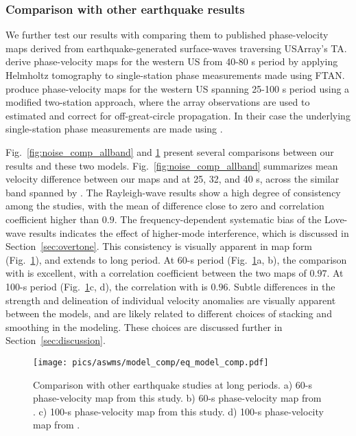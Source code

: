 \subsubsection{Comparison with other earthquake results}

We further test our results with comparing them to published phase-velocity maps derived from earthquake-generated surface-waves traversing USArray's TA. \citet{Lin:2011fw} derive phase-velocity maps for the western US from 40-80 s period by applying Helmholtz tomography to single-station phase measurements made using FTAN. \citet{foster:2014kna} produce phase-velocity maps for the western US spanning 25-100 s period using a modified two-station approach, where the array observations are used to estimated and correct for off-great-circle propagation. In their case the underlying single-station phase measurements are made using \citet{Ekstrom:1997ff}.

Fig.~\ref{fig:noise_comp_allband} and \ref{fig:eq_model_comp} present several comparisons between our results and these two models. Fig.~\ref{fig:noise_comp_allband} summarizes mean velocity difference between our maps and \citet{foster:2014kna} at 25, 32, and 40 s, across the similar band spanned by \citet{Ekstrom:2013dr}. The Rayleigh-wave results show a high degree of consistency among the studies, with the mean of difference close to zero and correlation coefficient higher than $0.9$. The frequency-dependent systematic bias of the Love-wave results indicates the effect of higher-mode interference, which is discussed in Section~\ref{sec:overtone}. This consistency is visually apparent in map form (Fig.~\ref{fig:eq_model_comp}), and extends to long period. At 60-s period (Fig.~\ref{fig:eq_model_comp}a, b), the comparison with \citet{Lin:2011fw} is excellent, with a correlation coefficient between the two maps of $0.97$. At 100-s period (Fig.~\ref{fig:eq_model_comp}c, d), the correlation with \citet{foster:2014kna} is $0.96$. Subtle differences in the strength and delineation of individual velocity anomalies are visually apparent between the models, and are likely related to different choices of stacking and smoothing in the modeling. These choices are discussed further in Section~\ref{sec:discussion}.


\begin{figure}
	\center
	\texttt{[image: pics/aswms/model\_comp/eq\_model\_comp.pdf]}
	\caption[Comparison with other earthquake studies at long periods.]{Comparison with other earthquake studies at long periods. a) 60-s phase-velocity map from this study. b) 60-s phase-velocity map from \citet{Lin:2011fw}. c) 100-s phase-velocity map from this study. d) 100-s phase-velocity map from \citet{foster:2014kna}.}
	\label{fig:eq_model_comp}
\end{figure}


